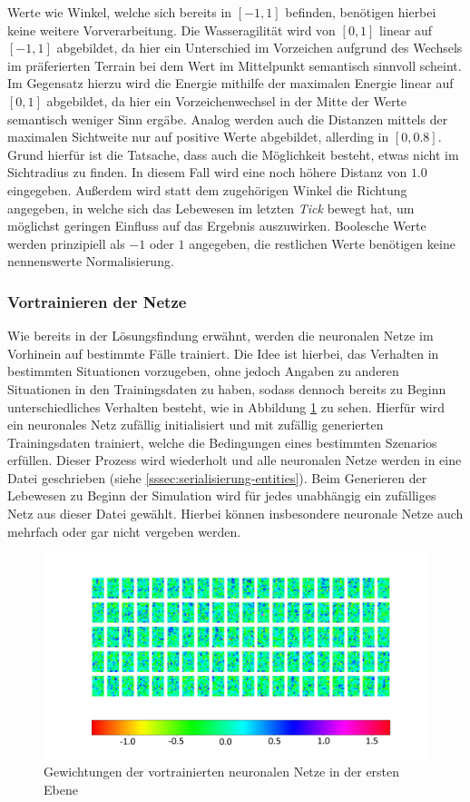 \documentclass[course=erap]{aspdoc}
\begin{document}
Werte wie Winkel, welche sich bereits in $[-1,1]$ befinden, benötigen hierbei keine weitere Vorverarbeitung. Die Wasseragilität wird von $[0,1]$ linear auf $[-1,1]$ abgebildet, da hier ein Unterschied im Vorzeichen aufgrund des Wechsels im präferierten Terrain bei dem Wert im Mittelpunkt semantisch sinnvoll scheint. Im Gegensatz hierzu wird die Energie mithilfe der maximalen Energie linear auf $[0,1]$ abgebildet, da hier ein Vorzeichenwechsel in der Mitte der Werte semantisch weniger Sinn ergäbe. Analog werden auch die Distanzen mittels der maximalen Sichtweite nur auf positive Werte abgebildet, allerding in $[0,0.8]$. Grund hierfür ist die Tatsache, dass auch die Möglichkeit besteht, etwas nicht im Sichtradius zu finden. In diesem Fall wird eine noch höhere Distanz von $1.0$ eingegeben. Außerdem wird statt dem zugehörigen Winkel die Richtung angegeben, in welche sich das Lebewesen im letzten \emph{Tick} bewegt hat, um möglichst geringen Einfluss auf das Ergebnis auszuwirken. Boolesche Werte werden prinzipiell als $-1$ oder $1$ angegeben, die restlichen Werte benötigen keine nennenswerte Normalisierung.

\subsubsection{Vortrainieren der Netze}
\label{sssec:pretraining}
Wie bereits in der Lösungsfindung erwähnt, werden die neuronalen Netze im Vorhinein auf bestimmte Fälle trainiert. Die Idee ist hierbei, das Verhalten in bestimmten Situationen vorzugeben, ohne jedoch Angaben zu anderen Situationen in den Trainingsdaten zu haben, sodass dennoch bereits zu Beginn unterschiedliches Verhalten besteht, wie in Abbildung \ref{fig:brain-weights} zu sehen. Hierfür wird ein neuronales Netz zufällig initialisiert und mit zufällig generierten Trainingsdaten trainiert, welche die Bedingungen eines bestimmten Szenarios erfüllen. Dieser Prozess wird wiederholt und alle neuronalen Netze werden in eine Datei geschrieben (siehe \ref{sssec:serialisierung-entities}). Beim Generieren der Lebewesen zu Beginn der Simulation wird für jedes unabhängig ein zufälliges Netz aus dieser Datei gewählt. Hierbei können insbesondere neuronale Netze auch mehrfach oder gar nicht vergeben werden.

\begin{figure}[H]
    \centering
    \includegraphics[width=\textwidth]{res/brainsWL0.png}
    \caption{Gewichtungen der vortrainierten neuronalen Netze in der ersten Ebene}
    \label{fig:brain-weights}
\end{figure}
\end{document}
